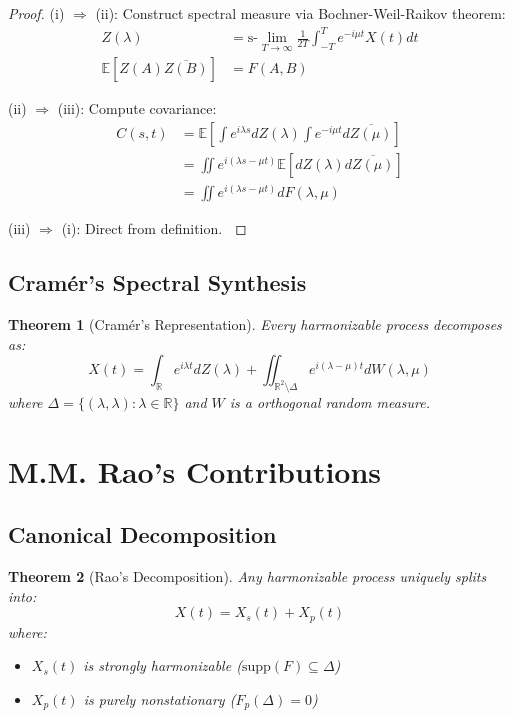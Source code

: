 \documentclass[12pt]{article}
\newtheorem{theorem}{Theorem}[section]
\begin{document}
\begin{proof}
(i) $\Rightarrow$ (ii): Construct spectral measure via Bochner-Weil-Raikov theorem:
\begin{align*}
Z(\lambda) &= \text{s-}\lim_{T\to\infty} \frac{1}{2T} \int_{-T}^T e^{-i\mu t}X(t)dt \\
\mathbb{E}[Z(A)\overline{Z(B)}] &= F(A,B)
\end{align*}

(ii) $\Rightarrow$ (iii): Compute covariance:
\begin{align*}
C(s,t) &= \mathbb{E}\left[\int e^{i\lambda s}dZ(\lambda)\int e^{-i\mu t}d\overline{Z(\mu)}\right] \\
&= \iint e^{i(\lambda s - \mu t)} \mathbb{E}[dZ(\lambda)d\overline{Z(\mu)}] \\
&= \iint e^{i(\lambda s - \mu t)} dF(\lambda,\mu)
\end{align*}

(iii) $\Rightarrow$ (i): Direct from definition. $\qedhere$
\end{proof}

\subsection{Cramér's Spectral Synthesis}

\begin{theorem}[Cramér's Representation]
Every harmonizable process decomposes as:
\begin{equation}
X(t) = \int_{\mathbb{R}} e^{i\lambda t} dZ(\lambda) + \iint_{\mathbb{R}^2\setminus\Delta} e^{i(\lambda - \mu)t} dW(\lambda,\mu)
\end{equation}
where $\Delta = \{(\lambda,\lambda):\lambda \in \mathbb{R}\}$ and $W$ is a orthogonal random measure.
\end{theorem}

\section{M.M. Rao's Contributions}

\subsection{Canonical Decomposition}

\begin{theorem}[Rao's Decomposition]
Any harmonizable process uniquely splits into:
\begin{equation}
X(t) = X_s(t) + X_p(t)
\end{equation}
where:
\begin{itemize}
\item $X_s(t)$ is strongly harmonizable ($\text{supp}(F) \subseteq \Delta$)
\item $X_p(t)$ is purely nonstationary ($F_p(\Delta) = 0$)
\end{itemize}
\end{theorem}
\end{document}
